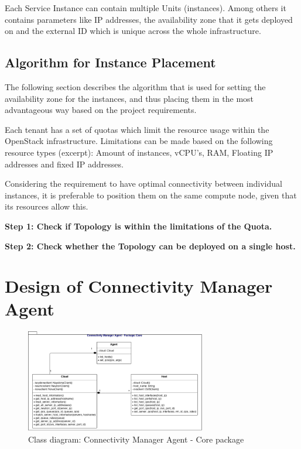 Each Service Instance can contain multiple Units (instances). Among others it contains parameters like IP addresses, the availability zone that it gets deployed on and the external ID which is unique across the whole infrastructure.



\subsection{Algorithm for Instance Placement}

The following section describes the algorithm that is used for setting the availability zone for the instances, and thus placing them in the most advantageous way based on the project requirements.


Each tenant has a set of quotas which limit the resource usage within the OpenStack infrastructure. Limitations can be made based on the following resource types (excerpt): Amount of instances, vCPU's, RAM, Floating IP addresses and fixed IP addresses.

Considering the requirement to have optimal connectivity between individual instances, it is preferable to position them on the same compute node, given that its resources allow this.

\textbf{Step 1: Check if Topology is within the limitations of the Quota.}

\textbf{Step 2: Check whether the Topology can be deployed on a single host.}



\newpage
\section{Design of Connectivity Manager Agent}

\begin{figure}[H]
\centering

\includegraphics[width=0.7\textwidth]{images/design/cm_agent_class_diagram}

\caption{Class diagram: Connectivity Manager Agent - Core package}
\end{figure}


